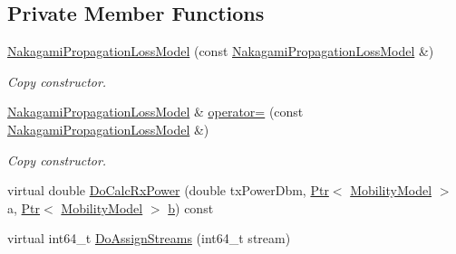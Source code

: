 \subsection*{Private Member Functions}
\begin{DoxyCompactItemize}
\item 
\hyperlink{classns3_1_1NakagamiPropagationLossModel_a457e24bb6cb6b095fa47c1771ebad858}{Nakagami\+Propagation\+Loss\+Model} (const \hyperlink{classns3_1_1NakagamiPropagationLossModel}{Nakagami\+Propagation\+Loss\+Model} \&)
\begin{DoxyCompactList}\small\item\em Copy constructor. \end{DoxyCompactList}\item 
\hyperlink{classns3_1_1NakagamiPropagationLossModel}{Nakagami\+Propagation\+Loss\+Model} \& \hyperlink{classns3_1_1NakagamiPropagationLossModel_a06bf43abce90e70e59886d63188b590e}{operator=} (const \hyperlink{classns3_1_1NakagamiPropagationLossModel}{Nakagami\+Propagation\+Loss\+Model} \&)
\begin{DoxyCompactList}\small\item\em Copy constructor. \end{DoxyCompactList}\item 
virtual double \hyperlink{classns3_1_1NakagamiPropagationLossModel_a23a080bfe8e23fc663a1408769d9f88f}{Do\+Calc\+Rx\+Power} (double tx\+Power\+Dbm, \hyperlink{classns3_1_1Ptr}{Ptr}$<$ \hyperlink{classns3_1_1MobilityModel}{Mobility\+Model} $>$ a, \hyperlink{classns3_1_1Ptr}{Ptr}$<$ \hyperlink{classns3_1_1MobilityModel}{Mobility\+Model} $>$ \hyperlink{lte__pathloss_8m_a21ad0bd836b90d08f4cf640b4c298e7c}{b}) const 
\item 
virtual int64\+\_\+t \hyperlink{classns3_1_1NakagamiPropagationLossModel_a74f478abef56ee59f085ec801eba4e8e}{Do\+Assign\+Streams} (int64\+\_\+t stream)
\end{DoxyCompactItemize}
